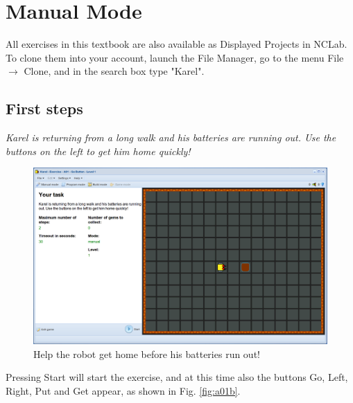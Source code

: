
\setcounter{section}{2}
\section{Manual Mode}

All exercises in this textbook are also available as Displayed Projects 
in NCLab. To clone them into your account, launch the File Manager, go
to the menu File $\rightarrow$ Clone, and in the search box type "Karel".  

\subsection{First steps}

{\em Karel is returning from a long walk and his batteries are running out. 
Use the buttons on the left to get him home quickly! }
\begin{figure}[!ht]
\begin{center}
\includegraphics[height=0.30\textwidth]{img/a01.png}
\end{center}
\vspace{-4mm}
\caption{Help the robot get home before his batteries run out!}
\label{fig:a01}
\end{figure}

\noindent
Pressing Start will start 
the exercise, and at this time also the buttons Go, Left, Right, Put and Get appear, 
as shown in Fig. \ref{fig:a01b}.


